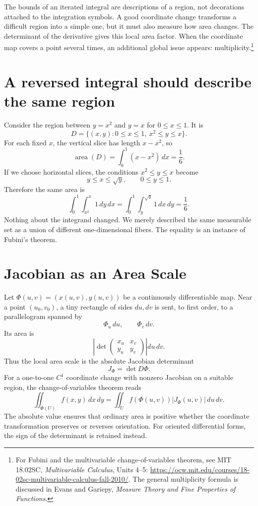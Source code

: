 
The bounds of an iterated integral are descriptions of a region, not decorations attached to the integration symbols. A good coordinate change transforms a difficult region into a simple one, but it must also measure how area changes. The determinant of the derivative gives this local area factor. When the coordinate map covers a point several times, an additional global issue appears: multiplicity.\footnote{For Fubini and the multivariable change-of-variables theorem, see MIT 18.02SC, \emph{Multivariable Calculus}, Units 4--5: \url{https://ocw.mit.edu/courses/18-02sc-multivariable-calculus-fall-2010/}. The general multiplicity formula is discussed in Evans and Gariepy, \emph{Measure Theory and Fine Properties of Functions}.}

\section{A reversed integral should describe the same region}

Consider the region between \(y=x^2\) and \(y=x\) for \(0\le x\le1\). It is
\[
 D=\{(x,y):0\le x\le1,\ x^2\le y\le x\}.
\]
For each fixed \(x\), the vertical slice has length \(x-x^2\), so
\[
 \operatorname{area}(D)=\int_0^1(x-x^2)\,dx=\frac16.
\]
If we choose horizontal slices, the conditions \(x^2\le y\le x\) become
\[
 y\le x\le\sqrt y,\qquad0\le y\le1.
\]
Therefore the same area is
\[
 \boxed{\int_0^1\int_{x^2}^{x}1\,dy\,dx
      =\int_0^1\int_y^{\sqrt y}1\,dx\,dy=\frac16.}
\]
Nothing about the integrand changed. We merely described the same measurable set as a union of different one-dimensional fibers. The equality is an instance of Fubini's theorem.

\section{Jacobian as an Area Scale}

Let \(\Phi(u,v)=(x(u,v),y(u,v))\) be a continuously differentiable map. Near a point \((u_0,v_0)\), a tiny rectangle of sides \(du,dv\) is sent, to first order, to a parallelogram spanned by
\[
 \Phi_u\,du,\qquad\Phi_v\,dv.
\]
Its area is
\[
 \left|\det\begin{pmatrix}x_u&x_v\\y_u&y_v\end{pmatrix}\right|du\,dv.
\]
Thus the local area scale is the absolute Jacobian determinant
\[
 J_\Phi=\det D\Phi.
\]
For a one-to-one \(C^1\) coordinate change with nonzero Jacobian on a suitable region, the change-of-variables theorem reads
\[
 \boxed{\iint_{\Phi(U)}f(x,y)\,dx\,dy
 =\iint_U f(\Phi(u,v))|J_\Phi(u,v)|\,du\,dv.}
\]
The absolute value ensures that ordinary area is positive whether the coordinate transformation preserves or reverses orientation. For oriented differential forms, the sign of the determinant is retained instead.


